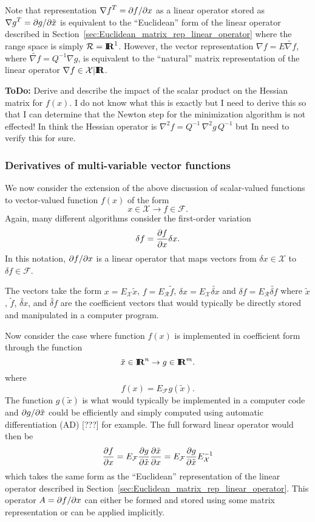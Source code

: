Note that representation ${\nabla f}^T = {}\partial f / \partial x$ as a linear operator
stored as ${\nabla g}^T = {}\partial g / \partial \tilde{x}$ is equivalent to the
``Euclidean'' form of the linear operator described in
Section~\ref{sec:Euclidean_matrix_rep_linear_operator} where the range space
is simply $\mathcal{R}=\mbox{\textbf{I}}\hspace{-0.6ex}\mbox{\textbf{R}}^1$.  However, the vector representation $\nabla f =
E {}\tilde{\nabla f}$, where $\tilde{\nabla f} = {Q}^{-1}
{}\nabla g$, is equivalent to the ``natural'' matrix representation of the
linear operator $\nabla f\in\mathcal{X}|\mbox{\textbf{I}}\hspace{-0.6ex}\mbox{\textbf{R}}$.

{}\textbf{ToDo:} Derive and describe the impact of the scalar product on the
Hessian matrix for $f(x)$.  I do not know what this is exactly but I need to
derive this so that I can determine that the Newton step for the minimization
algorithm is not effected!  In think the Hessian operator is $\nabla^2 f =
Q^{-1} {}\, {}\nabla^2 g {}\, Q^{-1}$ but In need to verify this for sure.

\subsubsection{Derivatives of multi-variable vector functions}
\label{sec:vector_function_derivatives}

We now consider the extension of the above discussion of scalar-valued
functions to vector-valued function $f(x)$ of the form
\[
x\in\mathcal{X} \rightarrow f\in\mathcal{F}.
\]
Again, many different algorithms consider the first-order variation
\[
\delta f = \displaystyle{\frac{\partial f}{\partial x}} \delta x.
\]
In this notation, $\partial f / \partial x$ is a linear operator that maps vectors from
$\delta x\in\mathcal{X}$ to $\delta f\in\mathcal{F}$.

The vectors take the form $x = E_{\mathcal{X}} {}\tilde{x}$, $f =
E_{\mathcal{R}} {}\tilde{f}$, $\delta x = E_{\mathcal{X}} {}\tilde{\delta x}$
and $\delta f = E_{\mathcal{R}} {}\tilde{\delta f}$ where ${}\tilde{x}$,
${}\tilde{f}$, ${}\tilde{\delta x}$, and ${}\tilde{\delta f}$ are the
coefficient vectors that would typically be directly stored and manipulated in
a computer program.

Now consider the case where function $f(x)$ is implemented in coefficient form
through the function
%
\[
\tilde{x}\in\mbox{\textbf{I}}\hspace{-0.6ex}\mbox{\textbf{R}}^n \rightarrow g\in\mbox{\textbf{I}}\hspace{-0.6ex}\mbox{\textbf{R}}^m.
\]
%
where
%
\[
f(x) = E_{\mathcal{F}} g(\tilde{x}).
\]
%
The function $g(\tilde{x})$ is what would typically be implemented in a
computer code and $\partial g / \partial \tilde{x}$ could be efficiently and simply
computed using automatic differentiation (AD) [???] for example.  The full
forward linear operator would then be
%
\begin{equation}
\displaystyle{\frac{\partial f}{\partial x}} = E_{\mathcal{F}} \displaystyle{\frac{\partial g}{\partial \tilde{x}}} \displaystyle{\frac{\partial \tilde{x}}{\partial x}}  = E_{\mathcal{F}} \displaystyle{\frac{\partial g}{\partial \tilde{x}}} E_{\mathcal{X}}^{-1}
\label{eqn:d_f_d_x_Euclidean}
\end{equation}
%
which takes the same form as the ``Euclidean'' representation of the linear
operator described in Section~\ref{sec:Euclidean_matrix_rep_linear_operator}.
This operator $A = \partial f / \partial x$ can either be formed and stored using some
matrix representation or can be applied implicitly.

